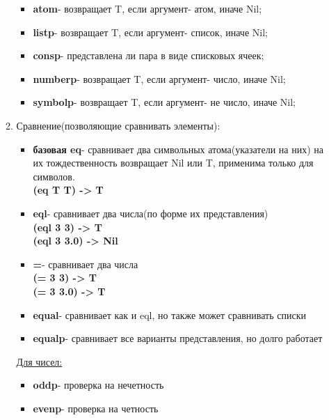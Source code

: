 \begin{enumerate}
\begin{enumerate}
\begin{itemize}
                    \item \textbf{atom}- возвращает T, если аргумент- атом, иначе Nil;
                    \item \textbf{listp}-  возвращает T, если аргумент- список, иначе Nil;
                    \item \textbf{consp}- представлена ли пара в виде списковых ячеек;
                    \item \textbf{numberp}- возвращает T, если аргумент- число, иначе Nil;
                    \item \textbf{symbolp}- возвращает T, если аргумент- не число, иначе Nil;
                \end{itemize}
            \item Сравнение(позволяющие сравнивать элементы):
                \begin{itemize}
                    \item \textbf{базовая eq}- сравнивает два символьных атома(указатели на них) на их тождественность возвращает Nil или T, применима только для символов.
                        \\ \textbf{(eq T T) -> T}
                    \item \textbf{eql}- сравнивает два числа(по форме их представления)
                        \\ \textbf{(eql 3 3) -> T}
                        \\ \textbf{(eql 3 3.0) -> Nil}
                    \item \textbf{=}- сравнивает два числа
                        \\ \textbf{(= 3 3) -> T}
                        \\ \textbf{(= 3 3.0) -> T}
                    \item \textbf{equal}- сравнивает как и eql, но также может сравнивать списки
                    \item \textbf{equalp}- сравнивает все варианты представления, но долго работает
                \end{itemize}
            \underline{Для чисел:}
                \begin{itemize}
                    \item \textbf{oddp}- проверка на нечетность
                    \item \textbf{evenp}- проверка на четность
                \end{itemize}
        \end{enumerate}
\end{enumerate}

